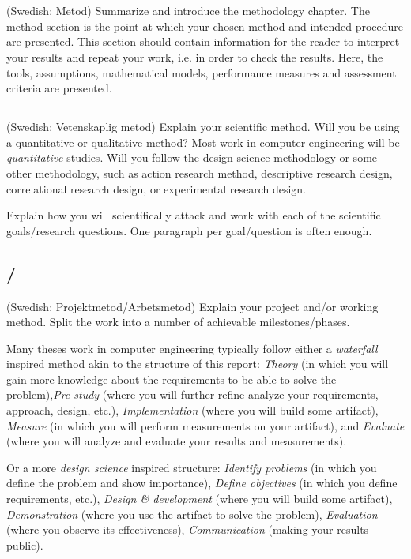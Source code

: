\section{}\label{sec:method}
(Swedish: Metod) Summarize and introduce the methodology chapter. The method section is the point at which your chosen method and intended procedure are presented. This section should contain information for the reader to interpret your results and repeat your work, i.e. in order to check the results. Here, the tools, assumptions, mathematical models, performance measures and assessment criteria are presented.

\subsection{}
(Swedish: Vetenskaplig metod) Explain your scientific method. Will you be using a quantitative or qualitative method? Most work in computer engineering will be \emph{quantitative} studies. Will you follow the design science methodology or some other methodology, such as action research method, descriptive research design, correlational research design, or experimental research design. 

Explain how you will scientifically attack and work with each of the scientific goals/research questions. One paragraph per goal/question is often enough.


\subsection{/}
(Swedish: Projektmetod/Arbetsmetod) Explain your project and/or working method. Split the work into a number of achievable milestones/phases. 

Many theses work in computer engineering typically follow either a \emph{waterfall} inspired method akin to the structure of this report: \emph{Theory} (in which you will gain more knowledge about the requirements to be able to solve the problem),\emph{Pre-study} (where you will further refine analyze your requirements, approach, design, etc.), \emph{Implementation} (where you will build some artifact), \emph{Measure} (in which you will perform measurements on your artifact), and \emph{Evaluate} (where you will analyze and evaluate your results and measurements). 

Or a more \emph{design science} inspired structure: \emph{Identify problems} (in which you define the problem and show importance), \emph{Define objectives} (in which you define requirements, etc.), \emph{Design \& development} (where you will build some artifact), \emph{Demonstration} (where you use the artifact to solve the problem), \emph{Evaluation} (where you observe its effectiveness), \emph{Communication} (making your results public). 

